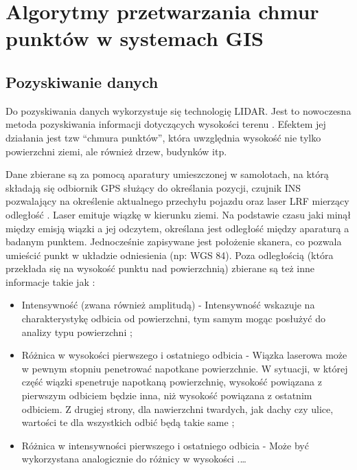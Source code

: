 \chapter{Algorytmy przetwarzania chmur punktów w systemach GIS}

\section{Pozyskiwanie danych}
Do pozyskiwania danych wykorzystuje się technologię LIDAR. Jest to nowoczesna metoda pozyskiwania informacji dotyczących wysokości terenu \cite{Marmol2003}. Efektem jej działania jest tzw “chmura punktów”, która uwzględnia wysokość nie tylko powierzchni ziemi, ale również drzew, budynków itp.

Dane zbierane są za pomocą aparatury umieszczonej w samolotach, na którą składają się odbiornik GPS służący do określania pozycji, czujnik INS pozwalający na określenie aktualnego przechyłu pojazdu oraz laser
LRF mierzący odległość \cite{WBPW2012}. Laser emituje wiązkę w kierunku ziemi. Na podstawie czasu jaki minął między emisją wiązki a jej odczytem, określana jest odległość między aparaturą a badanym punktem.
Jednocześnie zapisywane jest położenie skanera, co pozwala umieścić punkt w układzie odniesienia (np: WGS 84). Poza odległością (która przekłada się na wysokość punktu nad powierzchnią) zbierane są też inne
informacje takie jak \cite{chen2014}:
\begin{itemize}
\item Intensywność (zwana również amplitudą) - Intensywność wskazuje na charakterystykę odbicia od powierzchni, tym samym mogąc posłużyć do analizy typu powierzchni \cite{yunfei2008};
\item Różnica w wysokości pierwszego i ostatniego odbicia - Wiązka laserowa może w pewnym stopniu penetrować napotkane powierzchnie. W sytuacji, w której część wiązki spenetruje napotkaną powierzchnię,
    wysokość powiązana z pierwszym odbiciem będzie inna, niż wysokość powiązana z ostatnim odbiciem. Z drugiej strony, dla nawierzchni twardych, jak dachy czy ulice, wartości te dla wszystkich odbić będą 
    takie same \cite{chen2014};
\item Różnica w intensywności pierwszego i ostatniego odbicia - Może być wykorzystana analogicznie do różnicy w wysokości \cite{chen2014}.\ldots
\end{itemize}

